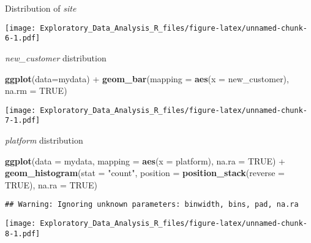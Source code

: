 \documentclass[]{article}
\newenvironment{Shaded}{\begin{snugshade}}{\end{snugshade}}
\newcommand{\KeywordTok}[1]{\textcolor[rgb]{0.13,0.29,0.53}{\textbf{{#1}}}}
\newcommand{\DataTypeTok}[1]{\textcolor[rgb]{0.13,0.29,0.53}{{#1}}}
\newcommand{\StringTok}[1]{\textcolor[rgb]{0.31,0.60,0.02}{{#1}}}
\newcommand{\OtherTok}[1]{\textcolor[rgb]{0.56,0.35,0.01}{{#1}}}
\newcommand{\NormalTok}[1]{{#1}}
\begin{document}
Distribution of \emph{site}

\begin{Shaded}
\end{Shaded}

\texttt{[image: Exploratory\_Data\_Analysis\_R\_files/figure-latex/unnamed-chunk-6-1.pdf]}

\emph{new\_customer} distribution

\begin{Shaded}
\begin{Highlighting}[]
\KeywordTok{ggplot}\NormalTok{(}\DataTypeTok{data=}\NormalTok{mydata) +}
\StringTok{  }\KeywordTok{geom_bar}\NormalTok{(}\DataTypeTok{mapping =} \KeywordTok{aes}\NormalTok{(}\DataTypeTok{x =} \NormalTok{new_customer), }\DataTypeTok{na.rm =} \OtherTok{TRUE}\NormalTok{)}
\end{Highlighting}
\end{Shaded}

\texttt{[image: Exploratory\_Data\_Analysis\_R\_files/figure-latex/unnamed-chunk-7-1.pdf]}

\emph{platform} distribution

\begin{Shaded}
\begin{Highlighting}[]
\KeywordTok{ggplot}\NormalTok{(}\DataTypeTok{data =} \NormalTok{mydata, }\DataTypeTok{mapping =} \KeywordTok{aes}\NormalTok{(}\DataTypeTok{x =} \NormalTok{platform), }\DataTypeTok{na.ra =} \OtherTok{TRUE}\NormalTok{) +}
\StringTok{  }\KeywordTok{geom_histogram}\NormalTok{(}\DataTypeTok{stat =} \StringTok{"count"}\NormalTok{, }\DataTypeTok{position =} \KeywordTok{position_stack}\NormalTok{(}\DataTypeTok{reverse =} \OtherTok{TRUE}\NormalTok{), }\DataTypeTok{na.ra =} \OtherTok{TRUE}\NormalTok{)}
\end{Highlighting}
\end{Shaded}

\begin{verbatim}
## Warning: Ignoring unknown parameters: binwidth, bins, pad, na.ra
\end{verbatim}

\texttt{[image: Exploratory\_Data\_Analysis\_R\_files/figure-latex/unnamed-chunk-8-1.pdf]}
\end{document}

